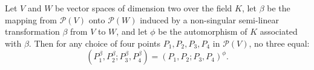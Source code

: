 Let $V$ and $W$ be vector spaces of dimension two over the field $K$, let $\beta$ be the mapping from $\mathcal{P}(V)$ onto $\mathcal{P}(W)$ induced by a non-singular semi-linear transformation $\beta$ from $V$ to $W$, and let $\phi$ be the automorphism of $K$ associated with $\beta$. Then for any choice of four points $P_1, P_2, P_3, P_4$ in $\mathcal{P}(V)$, no three equal:
$$(P_1^\beta, P_2^\beta; P_3^\beta, P_4^\beta) = (P_1, P_2; P_3, P_4)^\phi.$$
